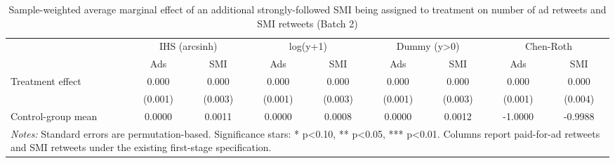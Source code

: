 \begin{table}[!htbp]
\centering
\caption{Sample-weighted average marginal effect of an additional strongly-followed SMI being assigned to treatment on number of ad retweets and SMI retweets (Batch 2)}
\begin{tabular}{lcccccccc}
\hline
 & \multicolumn{2}{c}{IHS (arcsinh)} & \multicolumn{2}{c}{log(y+1)} & \multicolumn{2}{c}{Dummy (y>0)} & \multicolumn{2}{c}{Chen-Roth} \\
 & Ads & SMI & Ads & SMI & Ads & SMI & Ads & SMI \\
\hline
Treatment effect & 0.000 & 0.000 & 0.000 & 0.000 & 0.000 & 0.000 & 0.000 & 0.000 \\
 & (0.001) & (0.003) & (0.001) & (0.003) & (0.001) & (0.003) & (0.001) & (0.004) \\
Control-group mean & 0.0000 & 0.0011 & 0.0000 & 0.0008 & 0.0000 & 0.0012 & -1.0000 & -0.9988 \\
\hline
\multicolumn{9}{l}{\parbox[t]{15.5cm}{\textit{Notes:} Standard errors are permutation-based. Significance stars: * p<0.10, ** p<0.05, *** p<0.01. Columns report paid-for-ad retweets and SMI retweets under the existing first-stage specification.}} \\
\end{tabular}
\end{table}
